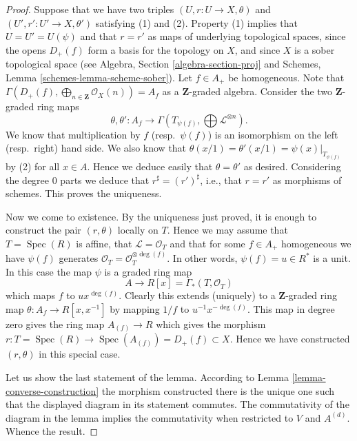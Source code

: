 \documentclass{stacks-project}
\theoremstyle{plain}
\theoremstyle{definition}
\theoremstyle{remark}
\numberwithin{equation}{subsection}
\def\Spec{\mathop{\mathrm{Spec}}}
\begin{document}
\begin{proof}
Suppose that we have two triples $(U, r : U \to X, \theta)$
and $(U', r' : U' \to X, \theta')$ satisfying (1) and (2).
Property (1) implies that $U = U' = U(\psi)$ and that
$r = r'$ as maps of underlying topological
spaces, since the opens $D_{+}(f)$ form a basis for the topology
on $X$, and since $X$ is a sober topological space (see
Algebra, Section \ref{algebra-section-proj}
and
Schemes, Lemma \ref{schemes-lemma-scheme-sober}).
Let $f \in A_{+}$ be homogeneous. Note that
$\Gamma(D_{+}(f), \bigoplus_{n \in \mathbf{Z}} \mathcal{O}_X(n)) = A_f$
as a $\mathbf{Z}$-graded algebra. Consider the two
$\mathbf{Z}$-graded ring maps
$$
\theta, \theta' :
A_f
\longrightarrow
\Gamma(T_{\psi(f)}, \bigoplus \mathcal{L}^{\otimes n}).
$$
We know that multiplication by $f$ (resp.\ $\psi(f)$)
is an isomorphism on the left (resp.\ right) hand side.
We also know that $\theta(x/1) = \theta'(x/1) = \psi(x)|_{T_{\psi(f)}}$
by (2) for all $x \in A$. Hence we deduce easily that $\theta = \theta'$
as desired. Considering the degree $0$ parts we deduce that
$r^\sharp = (r')^\sharp$, i.e., that $r = r'$ as morphisms of schemes.
This proves the uniqueness.

\medskip\noindent
Now we come to existence. By the uniqueness just proved, it is enough to
construct the pair $(r, \theta)$ locally on $T$. Hence we may assume
that $T = \Spec(R)$ is affine, that $\mathcal{L} = \mathcal{O}_T$
and that for some $f \in A_{+}$ homogeneous we have
$\psi(f)$ generates $\mathcal{O}_T = \mathcal{O}_T^{\otimes \deg(f)}$.
In other words, $\psi(f) = u \in R^*$ is a unit. In this case the map
$\psi$ is a graded ring map
$$
A \longrightarrow R[x] = \Gamma_*(T, \mathcal{O}_T)
$$
which maps $f$ to $ux^{\deg(f)}$. Clearly this extends (uniquely) to
a $\mathbf{Z}$-graded ring map $\theta : A_f \to R[x, x^{-1}]$ by
mapping $1/f$ to $u^{-1}x^{-\deg(f)}$. This map in degree zero gives
the ring map $A_{(f)} \to R$ which gives the morphism
$r : T = \Spec(R) \to \Spec(A_{(f)}) = D_{+}(f) \subset X$.
Hence we have constructed $(r, \theta)$ in this special case.

\medskip\noindent
Let us show the last statement of the lemma.
According to Lemma \ref{lemma-converse-construction}
the morphism constructed there is the unique one such that
the displayed diagram in its statement commutes.
The commutativity of the diagram in the lemma implies the
commutativity when restricted to $V$ and $A^{(d)}$.
Whence the result.
\end{proof}
\end{document}
